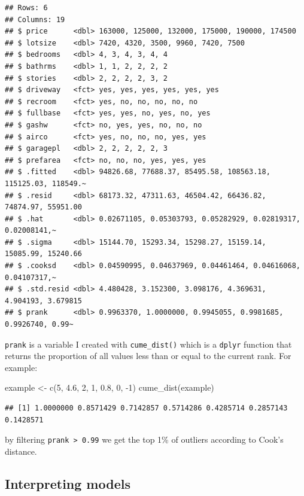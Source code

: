 \documentclass[
]{article}
\newenvironment{Shaded}{\begin{snugshade}}{\end{snugshade}}
\newcommand{\DecValTok}[1]{\textcolor[rgb]{0.00,0.00,0.81}{#1}}
\newcommand{\FloatTok}[1]{\textcolor[rgb]{0.00,0.00,0.81}{#1}}
\newcommand{\FunctionTok}[1]{\textcolor[rgb]{0.00,0.00,0.00}{#1}}
\newcommand{\NormalTok}[1]{#1}
\newcommand{\OtherTok}[1]{\textcolor[rgb]{0.56,0.35,0.01}{#1}}
\newcommand{\SpecialCharTok}[1]{\textcolor[rgb]{0.00,0.00,0.00}{#1}}
\begin{document}
\begin{verbatim}
## Rows: 6
## Columns: 19
## $ price      <dbl> 163000, 125000, 132000, 175000, 190000, 174500
## $ lotsize    <dbl> 7420, 4320, 3500, 9960, 7420, 7500
## $ bedrooms   <dbl> 4, 3, 4, 3, 4, 4
## $ bathrms    <dbl> 1, 1, 2, 2, 2, 2
## $ stories    <dbl> 2, 2, 2, 2, 3, 2
## $ driveway   <fct> yes, yes, yes, yes, yes, yes
## $ recroom    <fct> yes, no, no, no, no, no
## $ fullbase   <fct> yes, yes, no, yes, no, yes
## $ gashw      <fct> no, yes, yes, no, no, no
## $ airco      <fct> yes, no, no, no, yes, yes
## $ garagepl   <dbl> 2, 2, 2, 2, 2, 3
## $ prefarea   <fct> no, no, no, yes, yes, yes
## $ .fitted    <dbl> 94826.68, 77688.37, 85495.58, 108563.18, 115125.03, 118549.~
## $ .resid     <dbl> 68173.32, 47311.63, 46504.42, 66436.82, 74874.97, 55951.00
## $ .hat       <dbl> 0.02671105, 0.05303793, 0.05282929, 0.02819317, 0.02008141,~
## $ .sigma     <dbl> 15144.70, 15293.34, 15298.27, 15159.14, 15085.99, 15240.66
## $ .cooksd    <dbl> 0.04590995, 0.04637969, 0.04461464, 0.04616068, 0.04107317,~
## $ .std.resid <dbl> 4.480428, 3.152300, 3.098176, 4.369631, 4.904193, 3.679815
## $ prank      <dbl> 0.9963370, 1.0000000, 0.9945055, 0.9981685, 0.9926740, 0.99~
\end{verbatim}

\texttt{prank} is a variable I created with \texttt{cume\_dist()} which is a \texttt{dplyr} function that returns the
proportion of all values less than or equal to the current rank. For example:

\begin{Shaded}
\begin{Highlighting}[]
\NormalTok{example }\OtherTok{\textless{}{-}} \FunctionTok{c}\NormalTok{(}\DecValTok{5}\NormalTok{, }\FloatTok{4.6}\NormalTok{, }\DecValTok{2}\NormalTok{, }\DecValTok{1}\NormalTok{, }\FloatTok{0.8}\NormalTok{, }\DecValTok{0}\NormalTok{, }\SpecialCharTok{{-}}\DecValTok{1}\NormalTok{)}
\FunctionTok{cume\_dist}\NormalTok{(example)}
\end{Highlighting}
\end{Shaded}

\begin{verbatim}
## [1] 1.0000000 0.8571429 0.7142857 0.5714286 0.4285714 0.2857143 0.1428571
\end{verbatim}

by filtering \texttt{prank\ \textgreater{}\ 0.99} we get the top 1\% of outliers according to Cook's distance.

\hypertarget{interpreting-models}{%
\subsection{Interpreting models}\label{interpreting-models}}
\end{document}
